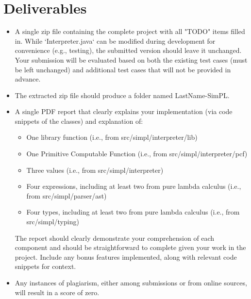 \documentclass{article}
\begin{document}
\section{Deliverables}
\begin{itemize}
  \item A single zip file containing the complete project with all "TODO" items filled in. While `Interpreter.java` can be modified during development for convenience (e.g., testing), the submitted version should leave it unchanged. Your submission will be evaluated based on both the existing test cases (must be left unchanged) and additional test cases that will not be provided in advance.
  \item The extracted zip file should produce a folder named LastName-SimPL.
  \item A single PDF report that clearly explains your implementation (via code snippets of the classes) and explanation of:
    \begin{itemize}
      \item One library function (i.e., from src/simpl/interpreter/lib)
      \item One Primitive Computable Function (i.e., from src/simpl/interpreter/pcf)
      \item Three values (i.e., from src/simpl/interpreter)
      \item Four expressions, including at least two from pure lambda calculus (i.e., from src/simpl/parser/ast)
      \item Four types, including at least two from pure lambda calculus (i.e., from src/simpl/typing)
    \end{itemize}
The report should clearly demonstrate your comprehension of each component and should be straightforward to complete given your work in the project. Include any bonus features implemented, along with relevant code snippets for context.

  \item Any instances of plagiarism, either among submissions or from online sources, will result in a score of zero.

\end{itemize}
\end{document}
